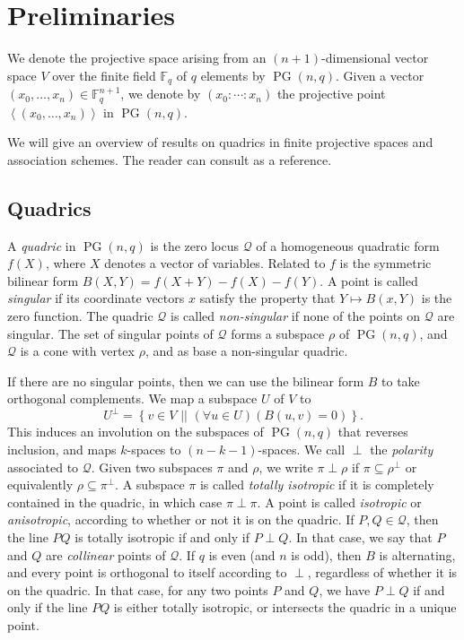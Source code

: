 \documentclass[a4paper]{article}
\theoremstyle{definition}
\newcommand{\FF}{\mathbb F}
\newcommand{\fq}{\FF_q}
\newcommand{\vspan}[1]{\left \langle #1 \right \rangle}
\newcommand{\sett}[2]{ \left\{ #1 \, \, || \, \, #2 \right \} }
\newcommand{\mq}{\mathcal Q}
\DeclareMathOperator{\PG}{PG}
\newcommand{\pg}{\PG}
\begin{document}
\section{Preliminaries}

We denote the projective space arising from an $(n+1)$-dimensional vector space $V$ over the finite field $\fq$ of $q$ elements by $\pg(n,q)$.
Given a vector $(x_0, \dots, x_n) \in \fq^{n+1}$, we denote by $(x_0: \cdots: x_n)$ the projective point $\vspan{(x_0,\dots,x_n)}$ in $\pg(n,q)$.

We will give an overview of results on quadrics in finite projective spaces and association schemes.
The reader can consult \cite{Brouwer:VanMaldeghem} as a reference.

\subsection{Quadrics}

A \emph{quadric} in $\pg(n,q)$ is the zero locus $\mq$ of a homogeneous quadratic form $f(X)$, where $X$ denotes a vector of variables.
Related to $f$ is the symmetric bilinear form $B(X,Y) = f(X+Y) - f(X) - f(Y)$.
A point is called \emph{singular} if its coordinate vectors $x$ satisfy the property that $Y \mapsto B(x,Y)$ is the zero function.
The quadric $\mq$ is called \emph{non-singular} if none of the points on $\mq$ are singular.
The set of singular points of $\mq$ forms a subspace $\rho$ of $\pg(n,q)$, and $\mq$ is a cone with vertex $\rho$, and as base a non-singular quadric.

If there are no singular points, then we can use the bilinear form $B$ to take orthogonal complements.
We map a subspace $U$ of $V$ to
\[
 U^\perp = \sett{v \in V}{(\forall u \in U)(B(u,v) = 0)}.
\]
This induces an involution on the subspaces of $\pg(n,q)$ that reverses inclusion, and maps $k$-spaces to $(n-k-1)$-spaces.
We call $\perp$ the \emph{polarity} associated to $\mq$.
Given two subspaces $\pi$ and $\rho$, we write $\pi \perp \rho$ if $\pi \subseteq \rho^\perp$ or equivalently $\rho \subseteq \pi^\perp$.
A subspace $\pi$ is called \emph{totally isotropic} if it is completely contained in the quadric, in which case $\pi \perp \pi$.
A point is called \emph{isotropic} or \emph{anisotropic}, according to whether or not it is on the quadric.
If $P, Q \in \mq$, then the line $PQ$ is totally isotropic if and only if $P \perp Q$.
In that case, we say that $P$ and $Q$ are \emph{collinear} points of $\mq$.
If $q$ is even (and $n$ is odd), then $B$ is alternating, and every point is orthogonal to itself according to $\perp$, regardless of whether it is on the quadric.
In that case, for any two points $P$ and $Q$, we have $P \perp Q$ if and only if the line $PQ$ is either totally isotropic, or intersects the quadric in a unique point.
\end{document}

